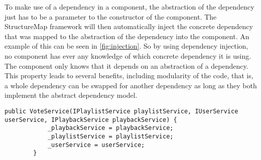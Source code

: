 To make use of a dependency in a component, the abstraction of the
dependency just has to be a parameter to the constructor of the
component. The StructureMap framework will then automatically inject
the concrete dependency that was mapped to the abstraction of the
dependency into the component. An example of this can be seen in
\cref{fig:injection}. So by using dependency injection, no component
has ever any knowledge of which concrete dependency it is using. The
component only knows that it depends on an abstraction of a
dependency. This property leads to several benefits, including
modularity of the code, that is, a whole dependency can be swapped for
another dependency as long as they both implement the abstract
dependency model.

\begin{lstlisting}[caption = {Dependency Injection through class
    constructors. IPlaylistService, IUserService and IPlaybackService
    are all abstractions of dependencies.}, label={fig:injection}]
public VoteService(IPlaylistService playlistService, IUserService userService, IPlaybackService playbackService) {
            _playbackService = playbackService;
            _playlistService = playlistService;
            _userService = userService;
        }
\end{lstlisting}
